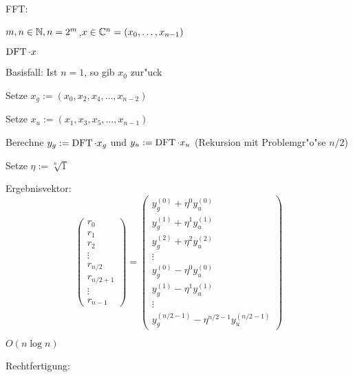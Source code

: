 \algorithm FFT:{
  \given $m,n\in\mathbb N,n=2^m$,$x\in\mathbb C^n=(x_0,\ldots,x_{n-1})$
  
  \aim $\operatorname{DFT} \cdot x$
  
  \begin{proc}
    \item Basisfall: Ist $n=1$, so gib $x_0$ zur"uck
    \item Setze $x_g:=(x_0,x_2,x_4,\ldots,x_{n-2})$
    \item Setze $x_u:=(x_1,x_3,x_5,\ldots,x_{n-1})$
    \item Berechne $y_g:=\operatorname{DFT}\cdot x_g$ und $y_u:=\operatorname{DFT}\cdot x_u$ 
      (Rekursion mit Problemgr"o"se $n/2$)
    \item Setze $\eta:=\sqrt[n]1$
    \item Ergebnisvektor:
      \[
        \begin{pmatrix}
          r_0 \\ r_1 \\ r_2 \\ \vdots \\ r_{n/2} \\ r_{n/2+1} \\ \vdots \\ r_{n-1}
        \end{pmatrix}
        =
        \begin{pmatrix}
          y_g^{(0)}+\eta^0 y_u^{(0)} \\
          y_g^{(1)}+\eta^1 y_u^{(1)} \\
          y_g^{(2)}+\eta^2 y_u^{(2)} \\
          \vdots \\
          y_g^{(0)}-\eta^0 y_u^{(0)} \\
          y_g^{(1)}-\eta^1 y_u^{(1)} \\
          \vdots \\
          y_g^{(n/2-1)}-\eta^{n/2-1} y_u^{(n/2-1)} 
        \end{pmatrix}
      \]
  \end{proc}
  
  \cpx $O(n\log n)$

  Rechtfertigung:
  
}
